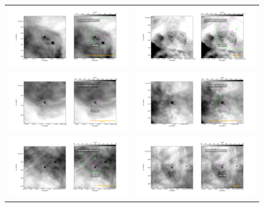 \documentclass{article}
\begin{document}
\begin{figure}[htp]
\centering
\begin{tabular}{l l}
    \includegraphics[width=0.5\linewidth]{j8oc01010_wcs/106-245-Bally_01-images.pdf}
   &\includegraphics[width=0.5\linewidth]{j8oc01010_wcs/109-246-Bally_01-images.pdf}\\
   \includegraphics[width=0.5\linewidth]{j8oc01010_wcs/117-421-Bally_01-images.pdf}
   &\includegraphics[width=0.5\linewidth]{j8oc01010_wcs/121-434-Bally_01-images.pdf}\\
   \includegraphics[width=0.5\linewidth]{j8oc01010_wcs/154-225-Bally_01-images.pdf}
   &\includegraphics[width=0.5\linewidth]{j8oc01010_wcs/154-240-Bally_01-images.pdf}\\
 \end{tabular}
\end{figure}
\end{document}
